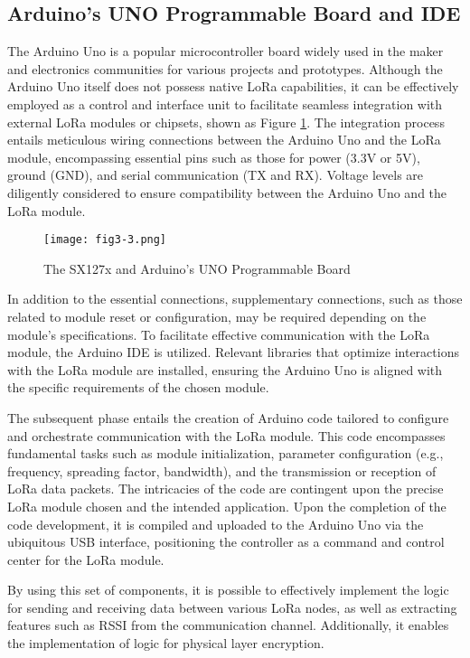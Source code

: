 \subsection{Arduino’s UNO Programmable Board and IDE}
The Arduino Uno is a popular microcontroller board widely used in the maker and electronics communities for various projects and prototypes. Although the Arduino Uno itself does not possess native LoRa capabilities, it can be effectively employed as a control and interface unit to facilitate seamless integration with external LoRa modules or chipsets, shown as Figure \ref{fig:3-3}. The integration process entails meticulous wiring connections between the Arduino Uno and the LoRa module, encompassing essential pins such as those for power (3.3V or 5V), ground (GND), and serial communication (TX and RX). Voltage levels are diligently considered to ensure compatibility between the Arduino Uno and the LoRa module. 
\begin{figure}
  \centering
  \texttt{[image: fig3-3.png]}
  \caption{The SX127x and Arduino’s UNO Programmable Board}
  \label{fig:3-3}
\end{figure}
In addition to the essential connections, supplementary connections, such as those related to module reset or configuration, may be required depending on the module's specifications. To facilitate effective communication with the LoRa module, the Arduino IDE is utilized. Relevant libraries that optimize interactions with the LoRa module are installed, ensuring the Arduino Uno is aligned with the specific requirements of the chosen module.

The subsequent phase entails the creation of Arduino code tailored to configure and orchestrate communication with the LoRa module. This code encompasses fundamental tasks such as module initialization, parameter configuration (e.g., frequency, spreading factor, bandwidth), and the transmission or reception of LoRa data packets. The intricacies of the code are contingent upon the precise LoRa module chosen and the intended application. Upon the completion of the code development, it is compiled and uploaded to the Arduino Uno via the ubiquitous USB interface, positioning the controller as a command and control center for the LoRa module.

By using this set of components, it is possible to effectively implement the logic for sending and receiving data between various LoRa nodes, as well as extracting features such as RSSI from the communication channel. Additionally, it enables the implementation of logic for physical layer encryption.

